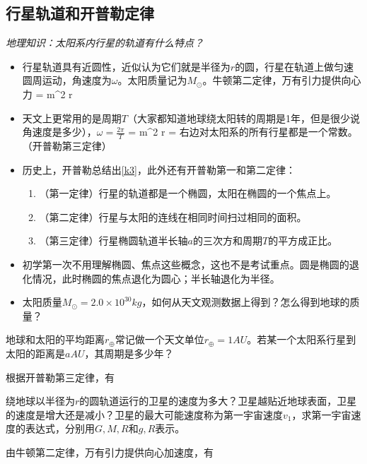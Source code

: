 \documentclass[a4paper,9pt]{ctexart}
\begin{document}
\subsection{行星轨道和开普勒定律}
\emph{地理知识：太阳系内行星的轨道有什么特点？}
\begin{itemize}
\item
行星轨道具有近圆性，近似认为它们就是半径为$r$的圆，行星在轨道上做匀速圆周运动，角速度为$\omega$。太阳质量记为$M_\odot$。\so 牛顿第二定律，万有引力提供向心力
\beq
{} = m\omega^2 r
\eeq
\item
天文上更常用的是周期$T$（大家都知道地球绕太阳转的周期是1年，但是很少说角速度是多少），$\omega = \frac{2\pi}{T}$ \so
\beq
{} = m\lbk {}\rbk^2 r
\eeq
\so
\beq \label{k3}
 = 
\eeq
右边对太阳系的所有行星都是一个常数。（开普勒第三定律）
\item
历史上，开普勒总结出\cref{k3}，此外还有开普勒第一和第二定律：
\begin{enumerate}
\item
（第一定律）行星的轨道都是一个椭圆，太阳在椭圆的一个焦点上。
\item
（第二定律）行星与太阳的连线在相同时间扫过相同的面积。
\item
（第三定律）行星椭圆轨道半长轴$a$的三次方和周期$T$的平方成正比。
\end{enumerate}
\item
初学第一次不用理解椭圆、焦点这些概念，这也不是考试重点。圆是椭圆的退化情况，此时椭圆的焦点退化为圆心；半长轴退化为半径。
\item
太阳质量$M_\odot = 2.0\times 10^{30}\unit{kg}$，如何从天文观测数据上得到？怎么得到地球的质量？
\end{itemize}
\begin{eg}
地球和太阳的平均距离$r_\oplus$常记做一个天文单位$r_\oplus = 1\unit{AU}$。若某一个太阳系行星到太阳的距离是$a\unit{AU}$，其周期是多少年？
\end{eg}
\begin{ans}
根据开普勒第三定律，有
\vspace{3cm}
\end{ans}
\begin{eg}
绕地球以半径为$r$的圆轨道运行的卫星的速度为多大？卫星越贴近地球表面，卫星的速度是增大还是减小？卫星的最大可能速度称为第一宇宙速度$v_1$，求第一宇宙速度的表达式，分别用$G,M,R$和$g,R$表示。
\end{eg}
\begin{ans}
由牛顿第二定律，万有引力提供向心加速度，有
\vspace{6cm}
\end{ans}
\end{document}
